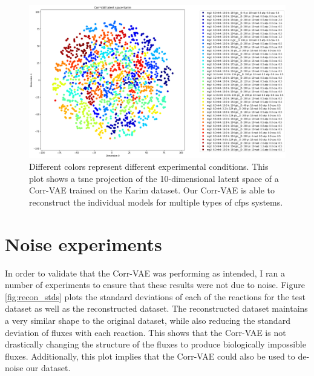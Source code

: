 \begin{figure}[t!]
\begin{center}
\includegraphics[width=1.01\textwidth]{figs/corrvae_karim_10d_latent.png}
\caption[Projection of the latent space of a 10-dimensional Corr-VAE trained on the Karim dataset]{Different colors represent different experimental conditions.
This plot shows a \gls{tsne} projection of the 10-dimensional latent space of a Corr-VAE trained on the Karim dataset.
Our Corr-VAE is able to reconstruct the individual models for multiple types of \gls{cfps} systems.
}
\label{fig:karim_10d}
\end{center}
\end{figure}

\section{Noise experiments}
In order to validate that the Corr-VAE was performing as intended, I ran a number of experiments to ensure that these results were not due to noise.
Figure \ref{fig:recon_stds} plots the standard deviations of each of the reactions for the test dataset as well as the reconstructed dataset.
The reconstructed dataset maintains a very similar shape to the original dataset, while also reducing the standard deviation of fluxes with each reaction.
This shows that the Corr-VAE is not drastically changing the structure of the fluxes to produce biologically impossible fluxes.
Additionally, this plot implies that the Corr-VAE could also be used to de-noise our dataset.


